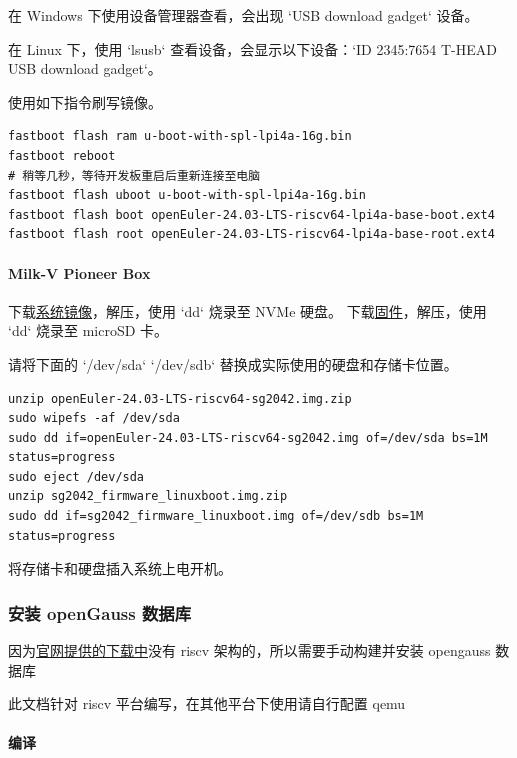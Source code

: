 \documentclass{article}
\begin{document}
在 Windows 下使用设备管理器查看，会出现 `USB download gadget` 设备。

在 Linux 下，使用 `lsusb` 查看设备，会显示以下设备：`ID 2345:7654 T-HEAD USB download gadget`。

使用如下指令刷写镜像。

\begin{verbatim}
fastboot flash ram u-boot-with-spl-lpi4a-16g.bin
fastboot reboot
# 稍等几秒，等待开发板重启后重新连接至电脑
fastboot flash uboot u-boot-with-spl-lpi4a-16g.bin
fastboot flash boot openEuler-24.03-LTS-riscv64-lpi4a-base-boot.ext4
fastboot flash root openEuler-24.03-LTS-riscv64-lpi4a-base-root.ext4
\end{verbatim}

\paragraph{Milk-V Pioneer Box}

下载\href{https://mirrors.hust.edu.cn/openeuler/openEuler-24.03-LTS/embedded_img/riscv64/SG2042/openEuler-24.03-LTS-riscv64-sg2042.img.zip}{系统镜像}，解压，使用 `dd` 烧录至 NVMe 硬盘。
下载\href{https://mirrors.hust.edu.cn/openeuler/openEuler-24.03-LTS/embedded_img/riscv64/SG2042/sg2042_firmware_linuxboot.img.zip}{固件}，解压，使用 `dd` 烧录至 microSD 卡。

请将下面的 `/dev/sda` `/dev/sdb` 替换成实际使用的硬盘和存储卡位置。

\begin{verbatim}
unzip openEuler-24.03-LTS-riscv64-sg2042.img.zip
sudo wipefs -af /dev/sda
sudo dd if=openEuler-24.03-LTS-riscv64-sg2042.img of=/dev/sda bs=1M status=progress
sudo eject /dev/sda
unzip sg2042_firmware_linuxboot.img.zip
sudo dd if=sg2042_firmware_linuxboot.img of=/dev/sdb bs=1M status=progress
\end{verbatim}
将存储卡和硬盘插入系统上电开机。

\subsubsection{安装 openGauss 数据库}

因为\href{https://opengauss.org/zh/download/}{官网提供的下载中}没有 riscv 架构的，所以需要手动构建并安装 opengauss 数据库

此文档针对 riscv 平台编写，在其他平台下使用请自行配置 qemu

\paragraph{编译}
\end{document}
